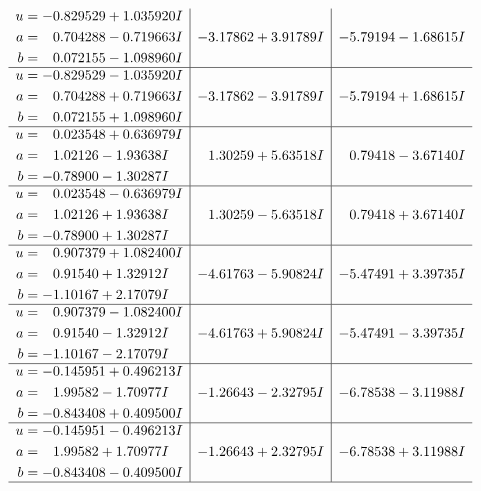 \documentclass[1p]{elsarticle_modified}
\theoremstyle{definition}
\begin{document}
$$\begin{array}{c|c|c}
\begin{aligned}
u &= -0.829529 + 1.035920 I \\
a &= \phantom{-}0.704288 - 0.719663 I \\
b &= \phantom{-}0.072155 - 1.098960 I\end{aligned}
 & -3.17862 + 3.91789 I & -5.79194 - 1.68615 I \\ \hline\begin{aligned}
u &= -0.829529 - 1.035920 I \\
a &= \phantom{-}0.704288 + 0.719663 I \\
b &= \phantom{-}0.072155 + 1.098960 I\end{aligned}
 & -3.17862 - 3.91789 I & -5.79194 + 1.68615 I \\ \hline\begin{aligned}
u &= \phantom{-}0.023548 + 0.636979 I \\
a &= \phantom{-}1.02126 - 1.93638 I \\
b &= -0.78900 - 1.30287 I\end{aligned}
 & \phantom{-}1.30259 + 5.63518 I & \phantom{-}0.79418 - 3.67140 I \\ \hline\begin{aligned}
u &= \phantom{-}0.023548 - 0.636979 I \\
a &= \phantom{-}1.02126 + 1.93638 I \\
b &= -0.78900 + 1.30287 I\end{aligned}
 & \phantom{-}1.30259 - 5.63518 I & \phantom{-}0.79418 + 3.67140 I \\ \hline\begin{aligned}
u &= \phantom{-}0.907379 + 1.082400 I \\
a &= \phantom{-}0.91540 + 1.32912 I \\
b &= -1.10167 + 2.17079 I\end{aligned}
 & -4.61763 - 5.90824 I & -5.47491 + 3.39735 I \\ \hline\begin{aligned}
u &= \phantom{-}0.907379 - 1.082400 I \\
a &= \phantom{-}0.91540 - 1.32912 I \\
b &= -1.10167 - 2.17079 I\end{aligned}
 & -4.61763 + 5.90824 I & -5.47491 - 3.39735 I \\ \hline\begin{aligned}
u &= -0.145951 + 0.496213 I \\
a &= \phantom{-}1.99582 - 1.70977 I \\
b &= -0.843408 + 0.409500 I\end{aligned}
 & -1.26643 - 2.32795 I & -6.78538 - 3.11988 I \\ \hline\begin{aligned}
u &= -0.145951 - 0.496213 I \\
a &= \phantom{-}1.99582 + 1.70977 I \\
b &= -0.843408 - 0.409500 I\end{aligned}
 & -1.26643 + 2.32795 I & -6.78538 + 3.11988 I\\
 \hline 
 \end{array}$$\newpage
\end{document}
